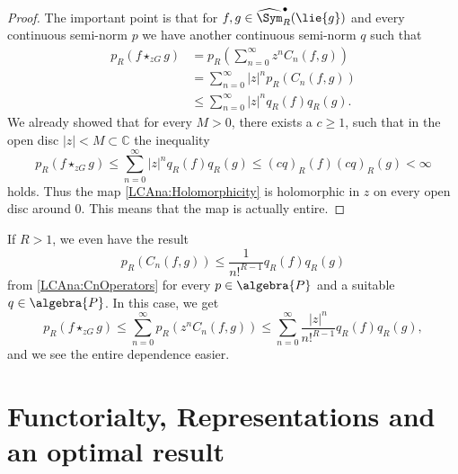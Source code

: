 \begin{proof}
	The important point is that for $f,g \in \widehat{\Sym}_R^{\bullet}
	(\lie{g})$ and every continuous semi-norm $p$ we have another 
	continuous semi-norm $q$ such that
	\begin{align*}
		p_R \left( f \star_{zG} g \right)
		& =
		p_R 
		\left(
			\sum\limits_{n=0}^{\infty}
			z^n C_n(f,g)
		\right)
		\\
		& =
		\sum\limits_{n=0}^{\infty}
		|z|^n
		p_R( C_n(f, g) )
		\\
		& \leq
		\sum\limits_{n=0}^{\infty}
		|z|^n
		q_R(f)
		q_R(g).
	\end{align*}
	We already showed that for every $M > 0$, there exists a $c \geq 1$, 
	such that in the open disc $|z| < M \subset \mathbb{C}$ the 
	inequality
	\begin{equation*}
		p_R \left( f \star_{zG} g \right)
		\leq
		\sum\limits_{n=0}^{\infty}
		|z|^n
		q_R(f)
		q_R(g)
		\leq
		(c q)_R(f)
		(c q)_R(g)
		<
		\infty
	\end{equation*}
	holds. Thus the map \eqref{LCAna:Holomorphicity} is holomorphic in 
	$z$ on every open disc around $0$. This means that the map is 
	actually entire.
\end{proof}
\begin{remark}
	If $R > 1$, we even have the result
	\begin{equation*}
		p_R \left(
			C_n (f, g)
		\right)
		\leq
		\frac{1}{n!^{R - 1}}
		q_R(f) q_R(g)
	\end{equation*}
	from \eqref{LCAna:CnOperators} for every $p \in \algebra{P}$ and a 
	suitable $q \in \algebra{P}$. In this case, we get
	\begin{equation*}
		p_R \left(
			f \star_{zG} g
		\right)
		\leq
		\sum\limits_{n = 0}^{\infty}
		p_R \left(
			z^n
			C_n (f, g)
		\right)
		\leq
		\sum\limits_{n = 0}^{\infty}
		\frac{|z|^n}{n!^{R - 1}}
		q_R(f) q_R(g),
	\end{equation*}
	and we see the entire dependence easier.
\end{remark}



\section{Functorialty, Representations and an optimal result}
\label{sec:chap5_Functoriality}

